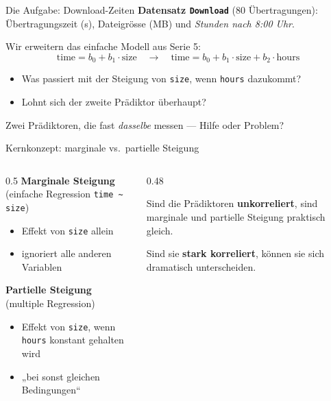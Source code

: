\documentclass[aspectratio=169,11pt]{beamer}
\begin{document}
\begin{frame}{Die Aufgabe: Download-Zeiten}
\textbf{Datensatz \texttt{Download}} (80 Übertragungen): Übertragungszeit
(s), Dateigrösse (MB) und \emph{Stunden nach 8:00 Uhr}.

\vspace{0.3cm}
Wir erweitern das einfache Modell aus Serie 5:
\[
  \text{time} = b_0 + b_1\cdot\text{size}
  \quad\longrightarrow\quad
  \text{time} = b_0 + b_1\cdot\text{size} + b_2\cdot\text{hours}
\]

\begin{itemize}
  \item Was passiert mit der Steigung von \texttt{size}, wenn
        \texttt{hours} dazukommt?
  \item Lohnt sich der zweite Prädiktor überhaupt?
\end{itemize}

\begin{merke}[Leitfrage]
Zwei Prädiktoren, die fast \emph{dasselbe} messen --- Hilfe oder Problem?
\end{merke}
\end{frame}

\begin{frame}{Kernkonzept: marginale vs.\ partielle Steigung}
\begin{columns}[T]
\begin{column}{0.5\textwidth}
\textbf{Marginale Steigung}\\
(einfache Regression \texttt{time \textasciitilde{} size})
\begin{itemize}
  \item Effekt von \texttt{size} \alert{allein}
  \item ignoriert alle anderen Variablen
\end{itemize}
\vspace{0.3cm}
\textbf{Partielle Steigung}\\
(multiple Regression)
\begin{itemize}
  \item Effekt von \texttt{size}, \alert{wenn \texttt{hours} konstant
        gehalten wird}
  \item „bei sonst gleichen Bedingungen``
\end{itemize}
\end{column}
\begin{column}{0.48\textwidth}
\begin{merke}
Sind die Prädiktoren \textbf{unkorreliert}, sind marginale und partielle
Steigung praktisch gleich.

\vspace{0.2cm}
Sind sie \textbf{stark korreliert}, können sie sich dramatisch
unterscheiden.
\end{merke}
\end{column}
\end{columns}
\end{frame}
\end{document}
